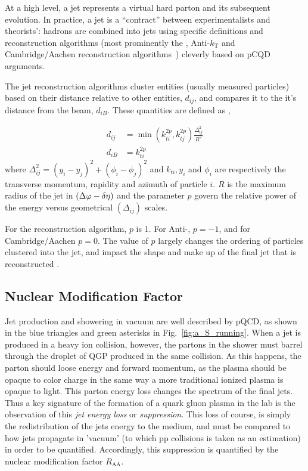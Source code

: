 At a high level, a jet represents a virtual hard parton and its subsequent evolution. In practice, a jet is a ``contract'' between experimentalists and theorists': hadrons are combined into jets using specific definitions and reconstruction algorithms (most prominently the \kt, Anti-$k_\mathrm{T}$ and Cambridge/Aachen reconstruction algorithms~\cite{Atkin2015}) cleverly based on pCQD arguments. 

The jet reconstruction algorithms cluster entities (usually measured particles) based on their distance relative to other entities, $d_{ij}$, and compares it to the it's distance from the beam, $d_{iB}$. These quantities are defined as \cite{Cacciari2008}, 

\begin{equation}
\begin{aligned}
d_{i j} &=\min \left(k_{t i}^{2 p}, k_{t j}^{2 p}\right) \frac{\Delta_{i j}^{2}}{R^{2}} \\
d_{i B} &=k_{t i}^{2 p}
\end{aligned}
\end{equation}
where $\Delta_{i j}^{2}=\left(y_{i}-y_{j}\right)^{2}+\left(\phi_{i}-\phi_{j}\right)^{2}$ and $k_{t i}, y_{i}$ and $\phi_{i}$ are respectively the transverse momentum, rapidity and azimuth of particle $i$. $R$ is the maximum radius of the jet in $(\Delta\varphi-\delta\eta)$ and the parameter $p$ govern the relative power of the energy versus geometrical $\left(\Delta_{i j}\right)$ scales.

For the \kt reconstruction algorithm, $p$ is 1. For Anti-\kt, $p=-1$, and for Cambridge/Aachen $p=0$. The value of $p$ largely changes the ordering of particles clustered into the jet, and impact the shape and make up of the final jet that is reconstructed \cite{Cacciari2008}.

\subsection{Nuclear Modification Factor}
\label{sec:raa}
Jet production and showering in vacuum are well described by pQCD, as shown in the blue triangles and green asterisks in Fig.~\ref{fig:a_S_running}. When a jet is produced in a heavy ion collision, however, the partons in the shower must barrel through the droplet of QGP produced in the same collision. As this happens, the parton should loose energy and forward momentum, as the plasma should be opaque to color charge in the same way a more traditional ionized plasma is opaque to light.  This parton energy loss changes the spectrum of the final jets. Thus a key signature of the formation of a quark gluon plasma in the lab is the observation of this \textit{jet energy loss} or \textit{suppression}. This loss of course, is simply the redistribution of the jets energy to the medium, and must be compared to how jets propagate in 'vacuum' (to which pp collisions is taken as an estimation) in order to be quantified. Accordingly, this suppression is quantified by the nuclear modification factor $R_\mathrm{AA}$. 

